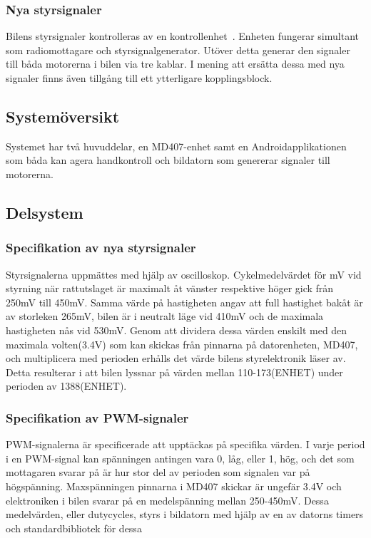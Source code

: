 \documentclass[a4paper]{article}
\begin{document}
\subsubsection{Nya styrsignaler}
Bilens styrsignaler kontrolleras av en kontrollenhet~\cite{projektDir}. Enheten fungerar simultant som radiomottagare och styrsignalgenerator. Utöver detta generar den signaler till båda motorerna i bilen via tre kablar. I mening att ersätta dessa med nya signaler finns även tillgång till ett ytterligare kopplingsblock.


\subsection{Systemöversikt}
Systemet har två huvuddelar, en MD407-enhet samt en Androidapplikationen som båda  kan agera handkontroll och bildatorn som genererar signaler till motorerna.


\subsection{Delsystem}
\subsubsection{Specifikation av nya styrsignaler}
Styrsignalerna uppmättes med hjälp av oscilloskop. Cykelmedelvärdet för mV vid styrning när rattutslaget är maximalt åt vänster respektive höger gick från 250mV till 450mV. Samma värde på hastigheten angav att full hastighet bakåt är av storleken 265mV, bilen är i neutralt läge vid 410mV och de maximala hastigheten nås vid 530mV. Genom att dividera dessa värden enskilt med den maximala volten(3.4V) som kan skickas från pinnarna på datorenheten, MD407, och multiplicera med perioden erhålls det värde bilens styrelektronik läser av. Detta resulterar i att bilen lyssnar på värden mellan 110-173(ENHET) under perioden av 1388(ENHET).

\subsubsection{Specifikation av PWM-signaler}
PWM-signalerna är specificerade att upptäckas på specifika värden. I varje period i en PWM-signal kan spänningen antingen vara 0, låg, eller 1, hög, och det som mottagaren svarar på är hur stor del av perioden som signalen var på högspänning. Maxspänningen pinnarna i MD407 skickar är ungefär 3.4V och elektroniken i bilen svarar på en medelspänning mellan 250-450mV. Dessa medelvärden, eller dutycycles, styrs i bildatorn med hjälp av en av datorns timers och standardbibliotek för dessa
\end{document}
